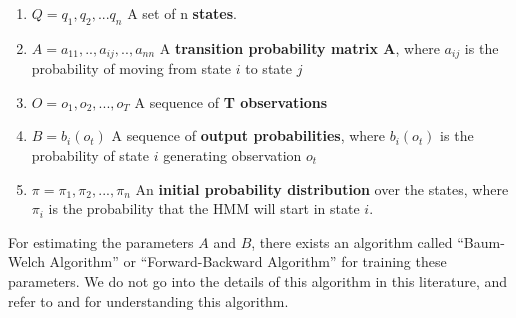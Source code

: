    \begin{enumerate}
   	\item $Q=q_1,q_2,...q_n$ \quad \quad \quad \quad A set of n \textbf{states}.
   	\item $A=a_{11},..,a_{ij},..,a_{nn}$ \quad \quad A \textbf{transition probability matrix A}, where $a_{ij}$ is the probability of moving from state $i$ to state $j$
   	\item $O=o_1,o_2,...,o_T$ \quad \quad \quad \quad A sequence of \textbf{T observations}
   	\item $B=b_i(o_t)$ \quad \quad \quad \quad \quad \quad \quad A sequence of \textbf{output probabilities}, where $b_i(o_t)$ is the probability of state $i$ generating observation $o_t$
   	\item $\pi = \pi_1,\pi_2,...,\pi_n$ \quad \quad \quad \quad An \textbf{initial probability distribution} over the states, where $\pi_i$ is the probability that the \ac{HMM} will start in state $i$.
   	 \cite{keselj2009speech} \cite{rabiner1989tutorial}
   	 
   \end{enumerate}



For estimating the parameters $A$ and $B$, there exists an algorithm called \enquote{Baum-Welch Algorithm} or \enquote{Forward-Backward Algorithm} for training these parameters. We do not go into the details of this algorithm in this literature, and refer to \cite{keselj2009speech} and \cite{baum1972inequality} for understanding this algorithm. 

